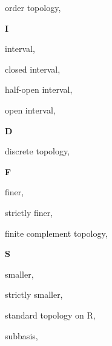\begin{multicols}{2}
order topology, \pageref{def:OrderTopology}

\vspace{1em}\large{\textbf{I}}

interval, \pageref{def:Interval}

\hspace{2em}closed interval, \pageref{def:Interval}

\hspace{2em}half-open interval, \pageref{def:Interval}

\hspace{2em}open interval, \pageref{def:Interval}

\vspace{1em}\large{\textbf{D}}

discrete topology, \pageref{def:DiscreteTopology}

\vspace{1em}\large{\textbf{F}}

finer, \pageref{def:Comparable}

\hspace{2em}strictly finer, \pageref{def:Comparable}

finite complement topology, \pageref{def:FiniteComplementTopology}

\vspace{1em}\large{\textbf{S}}

smaller, \pageref{def:Comparable}

\hspace{2em}strictly smaller, \pageref{def:Comparable}

standard topology on R, \pageref{def:StandardTopologyOnTheRealLine}

subbasis, \pageref{def:Subbasis}

\end{multicols}